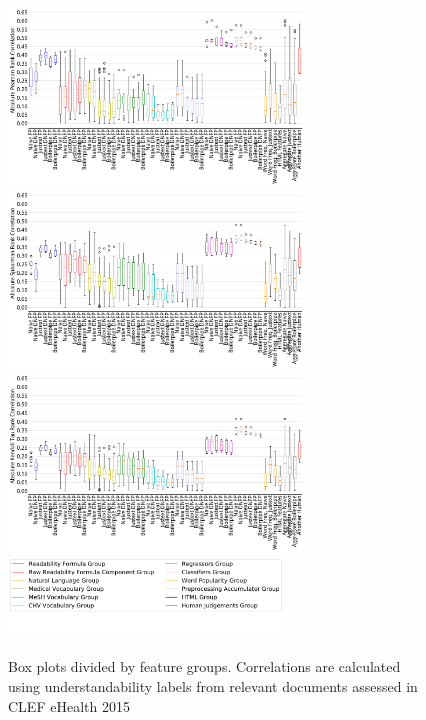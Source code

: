 \begin{figure}[th!]
   \centering
   \includegraphics[width=0.70\textwidth]{graphics/box_pearson15_raw_values}
   \includegraphics[width=0.70\textwidth]{graphics/box_spearman15_raw_values}
   \includegraphics[width=0.70\textwidth]{graphics/box_kendalltau15_raw_values}
    \includegraphics[width=0.65\textwidth]{graphics/legendCorr}
    \vspace{-1.cm}
    \caption{Box plots divided by feature groups. Correlations are calculated using understandability labels from relevant documents assessed in CLEF eHealth 2015}
   \label{fig:boxplot_corr_docs_2015}
\end{figure}


